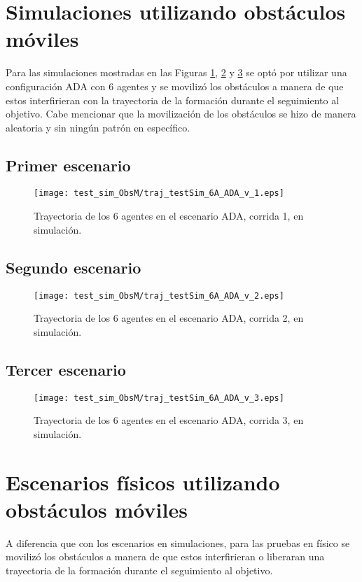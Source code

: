 \section{Simulaciones utilizando obstáculos móviles}
Para las simulaciones mostradas en las Figuras \ref{fig:traj_testSim_6A_ADA_v_1}, \ref{fig:traj_testSim_6A_ADA_v_2} y \ref{fig:traj_testSim_6A_ADA_v_3} se optó por utilizar una configuración ADA con 6 agentes y se movilizó los obstáculos a manera de que estos interfirieran con la trayectoria de la formación durante el seguimiento al objetivo. Cabe mencionar que la movilización de los obstáculos se hizo de manera aleatoria y sin ningún patrón en específico. 

\subsection{Primer escenario}
\begin{figure}[H]
	\centering
	\texttt{[image: test\_sim\_ObsM/traj\_testSim\_6A\_ADA\_v\_1.eps]}
	\caption{Trayectoria de los 6 agentes en el escenario ADA, corrida 1, en simulación.}
	\label{fig:traj_testSim_6A_ADA_v_1}
\end{figure}

\subsection{Segundo escenario}
\begin{figure}[H]
	\centering
	\texttt{[image: test\_sim\_ObsM/traj\_testSim\_6A\_ADA\_v\_2.eps]}
	\caption{Trayectoria de los 6 agentes en el escenario ADA, corrida 2, en simulación.}
	\label{fig:traj_testSim_6A_ADA_v_2}
\end{figure}

\subsection{Tercer escenario}
\begin{figure}[H]
	\centering
	\texttt{[image: test\_sim\_ObsM/traj\_testSim\_6A\_ADA\_v\_3.eps]}
	\caption{Trayectoria de los 6 agentes en el escenario ADA, corrida 3, en simulación.}
	\label{fig:traj_testSim_6A_ADA_v_3}
\end{figure}


\section{Escenarios físicos utilizando obstáculos móviles}
A diferencia que con los escenarios en simulaciones, para las pruebas en físico se movilizó los obstáculos a manera de que estos interfirieran o liberaran una trayectoria de la formación durante el seguimiento al objetivo.

